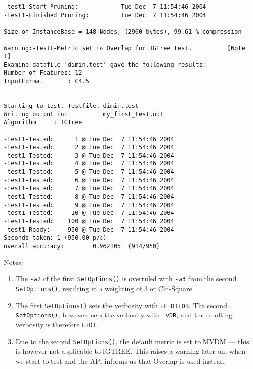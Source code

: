 \begin{footnotesize}
\begin{verbatim}
-test1-Start Pruning:            Tue Dec  7 11:54:46 2004
-test1-Finished Pruning:         Tue Dec  7 11:54:46 2004

Size of InstanceBase = 148 Nodes, (2960 bytes), 99.61 % compression

Warning:-test1-Metric set to Overlap for IGTree test.          [Note 1]
Examine datafile 'dimin.test' gave the following results:
Number of Features: 12
InputFormat       : C4.5


Starting to test, Testfile: dimin.test
Writing output in:          my_first_test.out
Algorithm     : IGTree

-test1-Tested:      1 @ Tue Dec  7 11:54:46 2004
-test1-Tested:      2 @ Tue Dec  7 11:54:46 2004
-test1-Tested:      3 @ Tue Dec  7 11:54:46 2004
-test1-Tested:      4 @ Tue Dec  7 11:54:46 2004
-test1-Tested:      5 @ Tue Dec  7 11:54:46 2004
-test1-Tested:      6 @ Tue Dec  7 11:54:46 2004
-test1-Tested:      7 @ Tue Dec  7 11:54:46 2004
-test1-Tested:      8 @ Tue Dec  7 11:54:46 2004
-test1-Tested:      9 @ Tue Dec  7 11:54:46 2004
-test1-Tested:     10 @ Tue Dec  7 11:54:46 2004
-test1-Tested:    100 @ Tue Dec  7 11:54:46 2004
-test1-Ready:     950 @ Tue Dec  7 11:54:46 2004
Seconds taken: 1 (950.00 p/s)
overall accuracy:        0.962105  (914/950)
\end{verbatim}
\end{footnotesize}


Notes:
\begin{enumerate}
\item The {\tt -w2} of the first {\tt SetOptions()} is overruled with {\tt -w3} from the
second {\tt SetOptions()}, resulting in a weighting of 3 or Chi-Square.
\item The first {\tt SetOptions()} sets the verbosity with {\tt +F+DI+DB}.
The second {\tt SetOptions()}, however, sets the verbosity with {\tt -vDB}, and the
resulting verbosity is therefore {\tt F+DI}.
\item Due to the second {\tt SetOptions()}, the default metric is set to
MVDM --- this is however not applicable to IGTREE. This raises a warning
later on, when we start to test and the API informs us that Overlap is
used instead.
\end{enumerate}

